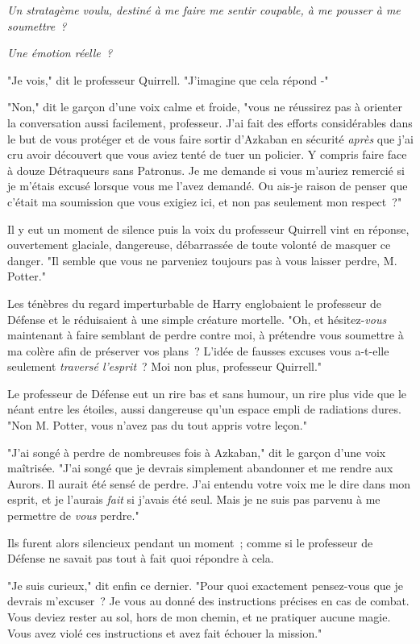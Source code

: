 \emph{Un stratagème voulu, destiné à me faire me sentir coupable, à me pousser à me soumettre~?}

\emph{Une émotion réelle~?}

"Je vois," dit le professeur Quirrell. "J'imagine que cela répond -"

"Non," dit le garçon d'une voix calme et froide, "vous ne réussirez pas à orienter la conversation aussi facilement, professeur. J'ai fait des efforts considérables dans le but de vous protéger et de vous faire sortir d'Azkaban en sécurité \emph{après} que j'ai cru avoir découvert que vous aviez tenté de tuer un policier. Y compris faire face à douze Détraqueurs sans Patronus. Je me demande si vous m'auriez remercié si je m'étais excusé lorsque vous me l'avez demandé. Ou ais-je raison de penser que c'était ma soumission que vous exigiez ici, et non pas seulement mon respect~?"

Il y eut un moment de silence puis la voix du professeur Quirrell vint en réponse, ouvertement glaciale, dangereuse, débarrassée de toute volonté de masquer ce danger. "Il semble que vous ne parveniez toujours pas à vous laisser perdre, M. Potter."

Les ténèbres du regard imperturbable de Harry englobaient le professeur de Défense et le réduisaient à une simple créature mortelle. "Oh, et hésitez-\emph{vous} maintenant à faire semblant de perdre contre moi, à prétendre vous soumettre à ma colère afin de préserver vos plans~? L'idée de fausses excuses vous a-t-elle seulement \emph{traversé l'esprit}~? Moi non plus, professeur Quirrell."

Le professeur de Défense eut un rire bas et sans humour, un rire plus vide que le néant entre les étoiles, aussi dangereuse qu'un espace empli de radiations dures. "Non M. Potter, vous n'avez pas du tout appris votre leçon."

"J'ai songé à perdre de nombreuses fois à Azkaban," dit le garçon d'une voix maîtrisée. "J'ai songé que je devrais simplement abandonner et me rendre aux Aurors. Il aurait été sensé de perdre. J'ai entendu votre voix me le dire dans mon esprit, et je l'aurais \emph{fait} si j'avais été seul. Mais je ne suis pas parvenu à me permettre de \emph{vous} perdre."

Ils furent alors silencieux pendant un moment~; comme si le professeur de Défense ne savait pas tout à fait quoi répondre à cela.

"Je suis curieux," dit enfin ce dernier. "Pour quoi exactement pensez-vous que je devrais m'excuser~? Je vous au donné des instructions précises en cas de combat. Vous deviez rester au sol, hors de mon chemin, et ne pratiquer aucune magie. Vous avez violé ces instructions et avez fait échouer la mission."

